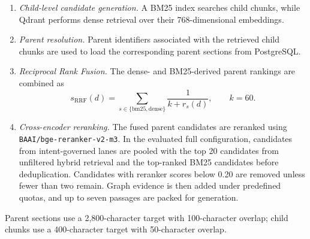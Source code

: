 \begin{enumerate}
    \setlength{\itemsep}{1.5pt}
    \setlength{\parsep}{0pt}
    \setlength{\parskip}{0pt}
    \item \emph{Child-level candidate generation.}
    A BM25 index searches child chunks, while Qdrant performs dense retrieval
    over their 768-dimensional embeddings.

    \item \emph{Parent resolution.}
    Parent identifiers associated with the retrieved child chunks are used to
    load the corresponding parent sections from PostgreSQL.

    \item \emph{Reciprocal Rank Fusion.}
    The dense- and BM25-derived parent rankings are combined as
    \[
        s_{\mathrm{RRF}}(d)
        = \sum_{s\in\{\mathrm{bm25},\mathrm{dense}\}}
          \frac{1}{k+r_s(d)}, \qquad k=60.
    \]

    \item \emph{Cross-encoder reranking.}
    The fused parent candidates are reranked using
    \texttt{BAAI/bge-reranker-v2-m3}. In the evaluated full configuration,
    candidates from intent-governed lanes are pooled with the top 20 candidates
    from unfiltered hybrid retrieval and the top-ranked BM25 candidates before
    deduplication. Candidates with reranker scores below 0.20 are removed unless
    fewer than two remain. Graph evidence is then added under predefined quotas,
    and up to seven passages are packed for generation.
\end{enumerate}

Parent sections use a 2,800-character target with 100-character overlap;
child chunks use a 400-character target with 50-character overlap.
